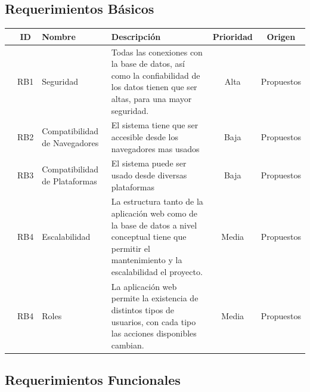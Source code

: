 \documentclass[12pt, fleqn]{report}                             %
\begin{document}
        \subsection{Requerimientos Básicos}

            \begin{tabular}{r ||c |m{7em} | m{15em} |c |c }
               &  ID & Nombre & Descripción & Prioridad & Origen \\ [0.5ex] 
               \hline\hline
              
                & RB1   & Seguridad                         &
                Todas las conexiones con la base de datos, así como la confiabilidad de los datos
                tienen que ser altas, para una mayor seguridad.
                & Alta  & Propuestos\\

                & RB2   & Compatibilidad de Navegadores     &
                El sistema tiene que ser accesible desde los navegadores mas usados
                & Baja  & Propuestos\\

                & RB3   & Compatibilidad de Plataformas     &
                El sistema puede ser usado desde diversas plataformas
                & Baja  & Propuestos\\

                & RB4   & Escalabilidad                     &
                La estructura tanto de la aplicación web como de la base de datos a nivel conceptual tiene
                que permitir el mantenimiento y la escalabilidad el proyecto.
                & Media  & Propuestos\\

                & RB4   & Roles                             &
                La aplicación web permite la existencia de distintos tipos de usuarios, con cada tipo
                las acciones disponibles cambian.
                & Media  & Propuestos\\

            \end{tabular}


        \subsection{Requerimientos Funcionales}
\end{document}
